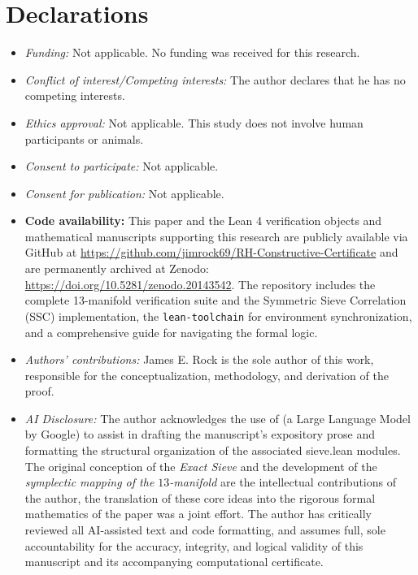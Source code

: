 \documentclass[sn-mathphys-num, pdflatex, referee]{sn-jnl}
\begin{document}
\section*{Declarations}

\begin{itemize}
\item \textit{Funding:} Not applicable. No funding was received for this research.
\item \textit{Conflict of interest/Competing interests:} The author declares that he has no competing interests.
\item \textit{Ethics approval:} Not applicable. This study does not involve human participants or animals.
\item \textit{Consent to participate:} Not applicable.
\item \textit{Consent for publication:} Not applicable.
\item \textbf{Code availability:} This paper and
the Lean 4 verification objects and mathematical manuscripts supporting 
this research are publicly available via GitHub at 
\url{https://github.com/jimrock69/RH-Constructive-Certificate} 
and are permanently archived at Zenodo: 
\href{https://doi.org/10.5281/zenodo.20143542}{https://doi.org/10.5281/zenodo.20143542}. The repository includes the complete 13-manifold verification suite and the Symmetric Sieve Correlation (SSC) implementation, the \texttt{lean-toolchain} for environment synchronization, and a comprehensive guide for navigating the formal logic. 
\item \textit{Authors' contributions:} James E. Rock is the sole author of this work, responsible for the conceptualization, methodology, and derivation of the proof.
\item \textit{AI Disclosure:} The author acknowledges the use of \cite{gemini} (a Large Language Model by Google) to assist in drafting the manuscript's expository prose and formatting the structural organization of the associated sieve.lean modules. The original conception of the \textit{Exact Sieve} and the development of the \textit{symplectic mapping of the $13$-manifold} are the intellectual contributions of the author, the translation of these core ideas into the rigorous formal mathematics of the paper was a joint effort. The author has critically reviewed all AI-assisted text and code formatting, and assumes full, sole accountability for the accuracy, integrity, and logical validity of this manuscript and its accompanying computational certificate.
\end{itemize}
 
\end{document}
